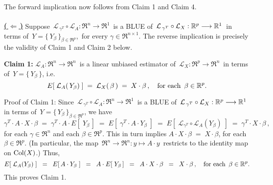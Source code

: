 \vskip 0.5cm
\noindent
The forward implication now follows from Claim 1 and Claim 4.

\vskip 0.5cm
\noindent
\textbf{\underline{(\,$\Longleftarrow$\,)}}\quad
Suppose
\,$\mathcal{L}_{\,\gamma^{T}} \circ \mathcal{L}_{A} : \Re^{n} \longrightarrow \Re^{1}$\,
is a BLUE of
\,$\overset{{\color{white}+}}{\mathcal{L}}_{\,\gamma^{T}} \circ \mathcal{L}_{X} : \Re^{p} \longrightarrow \Re^{1}$\,
in terms of
\,$Y = \{\,Y_{\beta}\,\}_{\beta\in\Re^{p}}$,\,
for every $\gamma \in \Re^{n \times 1}$.
The reverse implication is precisely the validity of Claim 1 and Claim 2 below.

\vskip 0.5cm
\noindent
\textbf{Claim 1:}\quad
$\mathcal{L}_{A} : \Re^{n} \longrightarrow \Re^{n}$\,
is a linear unbiased estimator of
\,$\mathcal{L}_{X} : \Re^{p} \longrightarrow \Re^{n}$\,
in terms of
\,$Y = \{\,Y_{\beta}\,\}$, i.e.
\begin{equation*}
E\!\left[\;\mathcal{L}_{A}(\,Y_{\beta})\;\right]
\;=\;
	\mathcal{L}_{X}(\,\beta\,)
\;=\;
	X \cdot \beta\,,
\quad
\textnormal{for each \,$\beta\in\Re^{p}$}.
\end{equation*}
Proof of Claim 1:\quad
Since \,$\mathcal{L}_{\,\gamma^{T}} \circ \mathcal{L}_{A} : \Re^{n} \longrightarrow \Re^{1}$\,
is a BLUE of
\,$\overset{{\color{white}+}}{\mathcal{L}}_{\,\gamma^{T}} \circ \mathcal{L}_{X} : \Re^{p} \longrightarrow \Re^{1}$\,
in terms of
\,$Y = \{\,Y_{\beta}\,\}_{\beta\in\Re^{p}}$,
we have
\begin{equation*}
\gamma^{T} \cdot A \cdot X \cdot \beta
\;=\;
	\gamma^{T} \cdot A \cdot E\!\left[\;Y_{\beta}\,\right]
\;=\;
	E\!\left[\;\gamma^{T} \cdot A \cdot Y_{\beta}\;\right]
\;=\;
	E\!\left[\;\mathcal{L}_{\gamma^{T}} \circ \mathcal{L}_{A}(Y_{\beta})\;\right]
\;=\;
	\gamma^{T} \cdot X \cdot \beta\,,
\end{equation*}
for each $\gamma \in \Re^{n}$ and each $\beta \in \Re^{p}$.
This in turn implies
$A \cdot X \cdot \beta \;=\; X \cdot \beta$,
for each \,$\beta \in \Re^{p}$.
(In particular, the map
\,$\Re^{n} \longrightarrow \Re^{n} : y \longmapsto A \cdot y$\,
restricts to the identity map on $\Col(X)$.)
Thus,
\begin{equation*}
E\!\left[\;\mathcal{L}_{A}(Y_{\beta})\;\right]
\;\;=\;\;
	E\!\left[\,A \cdot Y_{\beta}\;\right]
\;\;=\;\;
	A \cdot E\!\left[\;Y_{\beta}\,\right]
\;\;=\;\;
	A \cdot X \cdot \beta
\;\;=\;\;
	X \cdot \beta\,,
\quad
\textnormal{for each \,$\beta \in \Re^{p}$}.
\end{equation*}
This proves Claim 1.

